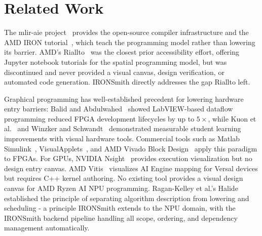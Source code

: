 \vspace{-1mm}
\section{Related Work} \label{sec:related_work}
\vspace{-3mm}

The mlir-aie project~\cite{mliraie} provides the open-source compiler infrastructure and the AMD IRON tutorial~\cite{iron2025}, which teach the programming model rather than lowering its barrier. AMD's Riallto~\cite{riallto} was the closest prior accessibility effort, offering Jupyter notebook tutorials for the spatial programming model, but was discontinued and never provided a visual canvas, design verification, or automated code generation. IRONSmith directly addresses the gap Riallto left.


Graphical programming has well-established precedent for lowering hardware entry barriers: Balid and Abdulwahed~\cite{balid2013} showed LabVIEW-based dataflow programming reduced FPGA development lifecycles by up to $5\times$, while Kuon et al.~\cite{kuon2014} and Winzker and Schwandt~\cite{winzker2019} demonstrated measurable student learning improvements with visual hardware tools. Commercial tools such as Matlab Simulink~\cite{simulink}, VisualApplets~\cite{visualapplets}, and AMD Vivado Block Design~\cite{vivado} apply this paradigm to FPGAs. For GPUs, NVIDIA Nsight~\cite{nsight} provides execution visualization but no design entry canvas. AMD Vitis~\cite{vitis} visualizes AI Engine mapping for Versal devices but requires C++ kernel authoring. No existing tool provides a visual design canvas for AMD Ryzen AI NPU programming. Ragan-Kelley et al.'s Halide~\cite{halide2013} established the principle of separating algorithm description from lowering and scheduling - a principle IRONSmith extends to the NPU domain, with the IRONSmith backend pipeline handling all scope, ordering, and dependency management automatically.

\vspace{-5mm}
